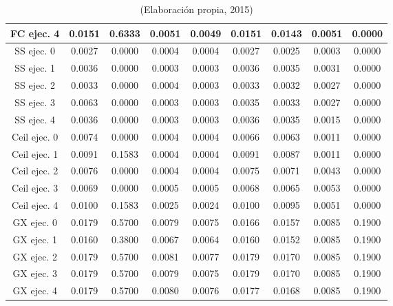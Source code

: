 \begin{table}[hbtp!]
\begin{center}
\begin{tabular}{c|cc|cc|cc|cc}
FC ejec. 4 & 0.0151 & 0.6333 & 0.0051 & 0.0049 & 0.0151 & 0.0143 & 0.0051 & 0.0000 \\ \hline
SS ejec. 0 & 0.0027 & 0.0000 & 0.0004 & 0.0004 & 0.0027 & 0.0025 & 0.0003 & 0.0000 \\
SS ejec. 1 & 0.0036 & 0.0000 & 0.0003 & 0.0003 & 0.0036 & 0.0035 & 0.0031 & 0.0000 \\
SS ejec. 2 & 0.0033 & 0.0000 & 0.0004 & 0.0003 & 0.0033 & 0.0032 & 0.0027 & 0.0000 \\
SS ejec. 3 & 0.0063 & 0.0000 & 0.0003 & 0.0003 & 0.0035 & 0.0033 & 0.0027 & 0.0000 \\
SS ejec. 4 & 0.0036 & 0.0000 & 0.0003 & 0.0003 & 0.0036 & 0.0035 & 0.0015 & 0.0000 \\ \hline
Ceil ejec. 0 & 0.0074 & 0.0000 & 0.0004 & 0.0004 & 0.0066 & 0.0063 & 0.0011 & 0.0000 \\
Ceil ejec. 1 & 0.0091 & 0.1583 & 0.0004 & 0.0004 & 0.0091 & 0.0087 & 0.0011 & 0.0000 \\
Ceil ejec. 2 & 0.0076 & 0.0000 & 0.0004 & 0.0004 & 0.0075 & 0.0071 & 0.0043 & 0.0000 \\
Ceil ejec. 3 & 0.0069 & 0.0000 & 0.0005 & 0.0005 & 0.0068 & 0.0065 & 0.0053 & 0.0000 \\
Ceil ejec. 4 & 0.0100 & 0.1583 & 0.0025 & 0.0024 & 0.0100 & 0.0095 & 0.0051 & 0.0000 \\ \hline
GX ejec. 0 & 0.0179 & 0.5700 & 0.0079 & 0.0075 & 0.0166 & 0.0157 & 0.0085 & 0.1900 \\
GX ejec. 1 & 0.0160 & 0.3800 & 0.0067 & 0.0064 & 0.0160 & 0.0152 & 0.0085 & 0.1900 \\
GX ejec. 2 & 0.0179 & 0.5700 & 0.0081 & 0.0077 & 0.0179 & 0.0170 & 0.0085 & 0.1900 \\
GX ejec. 3 & 0.0179 & 0.5700 & 0.0079 & 0.0075 & 0.0179 & 0.0170 & 0.0085 & 0.1900 \\
GX ejec. 4 & 0.0179 & 0.5700 & 0.0080 & 0.0076 & 0.0177 & 0.0168 & 0.0085 & 0.1900 \\
\hline
\end{tabular}
\end{center}
\caption*{(Elaboración propia, 2015)}
\end{table}

